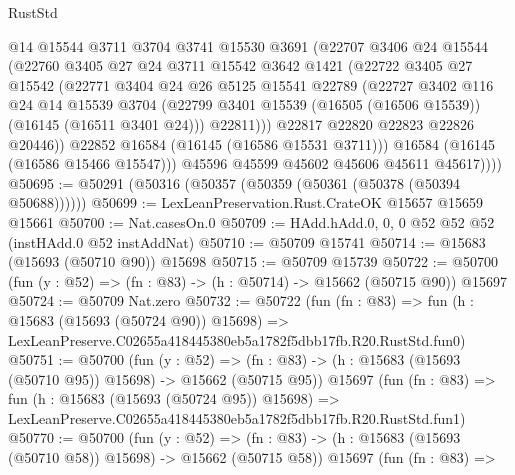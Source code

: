 \begin{lexlean}{RustStd}
\begin{coremodule}
                @14
                @15544
                @3711
                @3704
                @3741
                @15530
                @3691
                (@22707
                  @3406
                  @24
                  @15544
                  (@22760
                    @3405
                    @27
                    @24
                    @3711
                    @15542
                    @3642
                    @1421
                    (@22722
                      @3405
                      @27
                      @15542
                      (@22771
                        @3404
                        @24
                        @26
                        @5125
                        @15541
                        @22789
                        (@22727
                          @3402
                          @116
                          @24
                          @14
                          @15539
                          @3704
                          (@22799 @3401 @15539 (@16505 (@16506 @15539)) (@16145 (@16511 @3401 @24)))
                          @22811)))
                    @22817
                    @22820
                    @22823
                    @22826
                    @20446))
                @22852
                @16584
                (@16145 (@16586 @15531 @3711)))
              @16584
              (@16145 (@16586 @15466 @15547)))
            @45596
            @45599
            @45602
            @45606
            @45611
            @45617))))
@50695 := @50291 (@50316 (@50357 (@50359 (@50361 (@50378 (@50394 @50688))))))
@50699 := LexLeanPreservation.Rust.CrateOK @15657 @15659 @15661
@50700 := Nat.casesOn.{0}
@50709 := HAdd.hAdd.{0, 0, 0} @52 @52 @52 (instHAdd.{0} @52 instAddNat)
@50710 := @50709 @15741
@50714 := @15683 (@15693 (@50710 @90)) @15698
@50715 := @50709 @15739
@50722 := @50700 (fun (y : @52) => (fn : @83) -> (h : @50714) -> @15662 (@50715 @90)) @15697
@50724 := @50709 Nat.zero
@50732 := @50722
    (fun (fn : @83) =>
    fun (h : @15683 (@15693 (@50724 @90)) @15698) =>
    LexLeanPreserve.C02655a418445380eb5a1782f5dbb17fb.R20.RustStd.fun0)
@50751 := @50700
    (fun (y : @52) =>
    (fn : @83) -> (h : @15683 (@15693 (@50710 @95)) @15698) -> @15662 (@50715 @95))
    @15697
    (fun (fn : @83) =>
    fun (h : @15683 (@15693 (@50724 @95)) @15698) =>
    LexLeanPreserve.C02655a418445380eb5a1782f5dbb17fb.R20.RustStd.fun1)
@50770 := @50700
    (fun (y : @52) =>
    (fn : @83) -> (h : @15683 (@15693 (@50710 @58)) @15698) -> @15662 (@50715 @58))
    @15697
    (fun (fn : @83) =>

\end{coremodule}
\end{lexlean}
